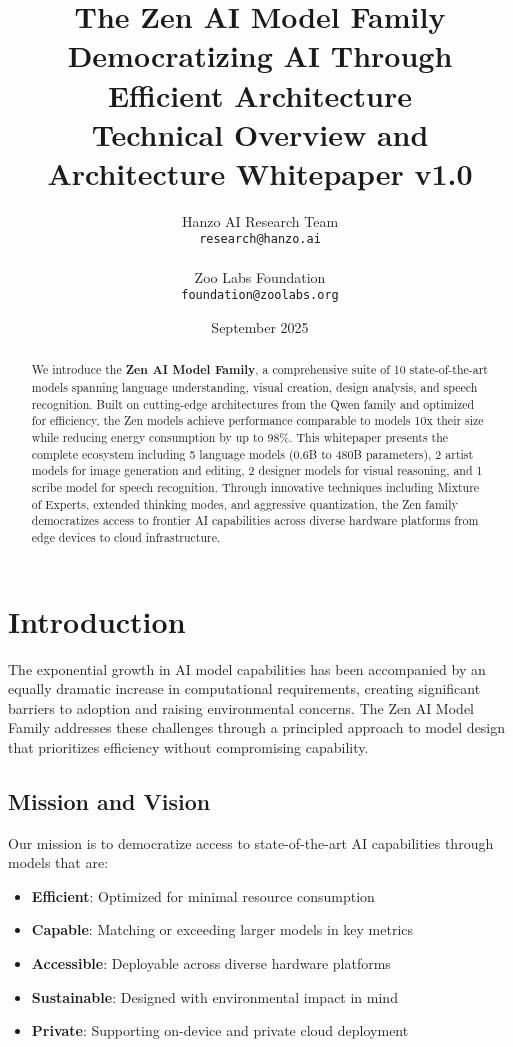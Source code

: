 \documentclass[11pt,a4paper]{article}
\title{
    \vspace{-2cm}
    \Huge \textbf{The Zen AI Model Family} \\
    \vspace{0.5cm}
    \Large Democratizing AI Through Efficient Architecture \\
    \vspace{0.3cm}
    \normalsize Technical Overview and Architecture Whitepaper v1.0
}
\author{
    Hanzo AI Research Team \\
    \texttt{research@hanzo.ai} \\
    \\
    Zoo Labs Foundation \\
    \texttt{foundation@zoolabs.org}
}
\date{September 2025}
\begin{document}
\maketitle

\begin{abstract}
We introduce the \textbf{Zen AI Model Family}, a comprehensive suite of 10 state-of-the-art models spanning language understanding, 
visual creation, design analysis, and speech recognition. Built on cutting-edge architectures from the Qwen family and optimized 
for efficiency, the Zen models achieve performance comparable to models 10x their size while reducing energy consumption by up to 98\%. 
This whitepaper presents the complete ecosystem including 5 language models (0.6B to 480B parameters), 2 artist models for image 
generation and editing, 2 designer models for visual reasoning, and 1 scribe model for speech recognition. Through innovative 
techniques including Mixture of Experts, extended thinking modes, and aggressive quantization, the Zen family democratizes 
access to frontier AI capabilities across diverse hardware platforms from edge devices to cloud infrastructure.
\end{abstract}

\tableofcontents
\newpage

\section{Introduction}

The exponential growth in AI model capabilities has been accompanied by an equally dramatic increase in computational requirements, 
creating significant barriers to adoption and raising environmental concerns. The Zen AI Model Family addresses these challenges 
through a principled approach to model design that prioritizes efficiency without compromising capability.

\subsection{Mission and Vision}

Our mission is to democratize access to state-of-the-art AI capabilities through models that are:
\begin{itemize}
    \item \textbf{Efficient}: Optimized for minimal resource consumption
    \item \textbf{Capable}: Matching or exceeding larger models in key metrics
    \item \textbf{Accessible}: Deployable across diverse hardware platforms
    \item \textbf{Sustainable}: Designed with environmental impact in mind
    \item \textbf{Private}: Supporting on-device and private cloud deployment
\end{itemize}
\end{document}
